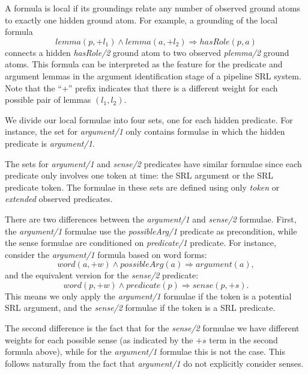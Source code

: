 
A formula is local if its groundings relate any number of observed ground atoms 
to exactly one hidden ground atom.  For example, a grounding of the local 
formula \[lemma(p,+l_1) \wedge lemma(a,+l_2) \Rightarrow hasRole(p,a)\]
connects a hidden \emph{hasRole/2} ground atom to two observed \emph{plemma/2} 
ground atoms. This formula can be interpreted as the feature for the predicate 
and argument lemmas in the argument identification stage of a pipeline SRL 
system.
Note that the ``+'' prefix indicates that there is a different weight for each 
possible pair of lemmas $(l_1,l_2)$.

We divide our local formulae into four sets, one for each hidden predicate.  For 
instance, the set for \emph{argument/1} only contains formulae in which the hidden 
predicate is \emph{argument/1}. 

The sets for \emph{argument/1} and \emph{sense/2} predicates have similar 
formulae since each predicate only involves one token at time: the SRL argument 
or the SRL predicate token. The formulae in these sets are defined using only 
\emph{token} or \emph{extended} observed predicates. 

There are two differences 
between the  \emph{argument/1} and \emph{sense/2} formulae.  First, the \emph{argument/1} formulae use 
the \emph{possibleArg/1} predicate as precondition, while the sense formulae are conditioned on 
\emph{predicate/1} predicate. For instance, consider the \emph{argument/1} 
formula based on word forms: \[word(a,+w) \land possibleArg(a) \Rightarrow 
argument(a),\] and the equivalent version for the \emph{sense/2} predicate: \[word(p,+w) 
\land predicate(p) \Rightarrow sense(p,+s).\] This means we only apply the 
\emph{argument/1} formulae if the token is a potential SRL argument, and 
the \emph{sense/2} formulae if the token is a SRL predicate. 

The second difference is the fact that for the \emph{sense/2} formulae we have different weights for each possible sense (as indicated by the $+s$ term in the second formula above), while for the \emph{argument/1} formulae this is not the case. This follows naturally from the fact that  \emph{argument/1}  do not explicitly consider senses. 


